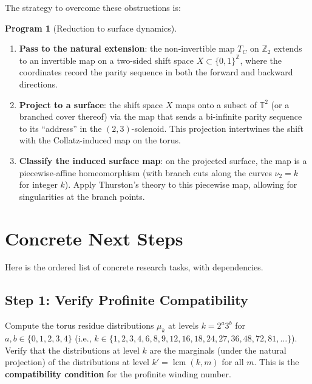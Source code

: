 \documentclass[11pt,a4paper]{article}
\newcommand{\Z}{\mathbb{Z}}
\newcommand{\T}{\mathbb{T}}
\DeclareMathOperator{\lcm}{lcm}
\theoremstyle{plain}
\theoremstyle{definition}
\newtheorem{program}[theorem]{Program}
\begin{document}
The strategy to overcome these obstructions is:

\begin{program}[Reduction to surface dynamics]\label{prog:surface}
\begin{enumerate}
    \item \textbf{Pass to the natural extension}: the non-invertible map $T_C$ on $\Z_2$ extends to an invertible map on a two-sided shift space $X \subset \{0,1\}^{\Z}$, where the coordinates record the parity sequence in both the forward and backward directions.

    \item \textbf{Project to a surface}: the shift space $X$ maps onto a subset of $\T^2$ (or a branched cover thereof) via the map that sends a bi-infinite parity sequence to its ``address'' in the $(2,3)$-solenoid. This projection intertwines the shift with the Collatz-induced map on the torus.

    \item \textbf{Classify the induced surface map}: on the projected surface, the map is a piecewise-affine homeomorphism (with branch cuts along the curves $\nu_2 = k$ for integer $k$). Apply Thurston's theory to this piecewise map, allowing for singularities at the branch points.
\end{enumerate}
\end{program}


\section{Concrete Next Steps}\label{sec:next}

Here is the ordered list of concrete research tasks, with dependencies.

\subsection{Step 1: Verify Profinite Compatibility}

\begin{nextstep}[Computational]
Compute the torus residue distributions $\mu_k$ at levels $k = 2^a 3^b$ for $a, b \in \{0, 1, 2, 3, 4\}$ (i.e., $k \in \{1, 2, 3, 4, 6, 8, 9, 12, 16, 18, 24, 27, 36, 48, 72, 81, \ldots\}$). Verify that the distributions at level $k$ are the marginals (under the natural projection) of the distributions at level $k' = \lcm(k, m)$ for all $m$. This is the \textbf{compatibility condition} for the profinite winding number.
\end{nextstep}
\end{document}
